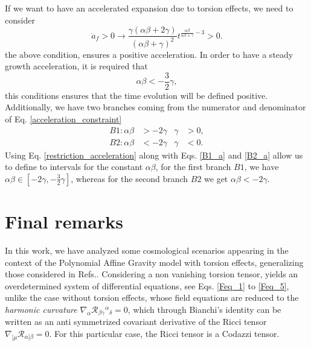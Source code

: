 If we want to have an accelerated expansion due to torsion effects, we need to consider
\begin{equation}
    \label{acceleration_constraint}
    \ddot{a}_f > 0 \to \frac{\gamma\left(\alpha\beta + 2\gamma\right)}{\left(\alpha\beta + \gamma\right)^2}t^{\frac{\alpha\beta}{\alpha\beta + \gamma} - 3} > 0.
\end{equation}
the above condition, ensures a positive acceleration. In order to have a steady growth acceleration, it is required that 
\begin{equation}
    \label{restriction_acceleration}
    \alpha\beta < -\frac{3}{2}\gamma,
\end{equation}
this conditions ensures that the time evolution will be defined positive. Additionally, we have two branches coming from 
the numerator and denominator of Eq. \eqref{acceleration_constraint}
\begin{align}
    B1: \alpha\beta & > -2\gamma & \gamma & > 0, \label{B1_a} \\
    B2: \alpha\beta & < -2\gamma & \gamma & < 0. \label{B2_a}
\end{align}
Using Eq. \eqref{restriction_acceleration} along with Eqs. \eqref{B1_a} and \eqref{B2_a} allow us to define to intervals for the
constant $\alpha\beta$, for the first branch $B1$, we have $\alpha\beta \in \left[-2\gamma, -\frac{3}{2}\gamma\right]$, 
whereas for the second branch $B2$ we get $\alpha\beta <-2\gamma$. 

\section{Final remarks}
\label{sec:final_remarks}

In this work, we have analyzed some cosmological scenarios appearing in the context of the 
Polynomial Affine Gravity model with torsion effects, generalizing those considered in 
Refs.\cite{castillofelisola2019cosmological,Castillo_Felisola_2020}. Considering a non 
vanishing torsion tensor, yields an overdetermined system of differential equations, 
see Eqs. \eqref{Feq_1} to \eqref{Feq_5}, unlike the case without torsion effects, whose
field equations are reduced to the \textit{harmonic curvature} $\nabla_\alpha 
\mathcal{R}_{\beta\gamma}{}^{\alpha}{}_{\delta} = 0$, which through Bianchi's identity 
can be written as an anti symmetrized covariant derivative of the Ricci tensor $\nabla_{[\mu} 
\mathcal{R}_{\alpha]\beta} = 0$. For this particular case, the Ricci tensor is a
Codazzi tensor.

